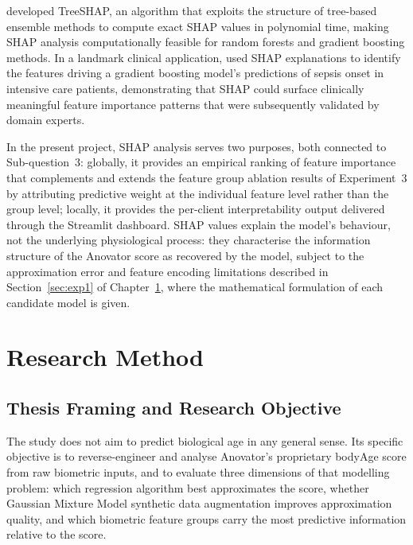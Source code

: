 \documentclass[11pt,a4paper]{report}
\begin{document}
\citet{Lundberg2020} developed TreeSHAP, an algorithm that exploits the structure of tree-based
ensemble methods to compute exact SHAP values in polynomial time, making SHAP analysis
computationally feasible for random forests and gradient boosting methods. In a landmark clinical
application, \citet{Lundberg2018} used SHAP explanations to identify the features driving a gradient
boosting model's predictions of sepsis onset in intensive care patients, demonstrating that SHAP
could surface clinically meaningful feature importance patterns that were subsequently validated by
domain experts.

In the present project, SHAP analysis serves two purposes, both connected to Sub-question~3: globally, it provides an empirical ranking of feature importance that complements and extends the feature group ablation results of Experiment~3 by attributing predictive weight at the individual feature level rather than the group level; locally, it provides the per-client interpretability output delivered through the Streamlit dashboard. SHAP values explain the model's behaviour, not the underlying physiological process: they characterise
the information structure of the Anovator score as recovered by the model, subject to the
approximation error and feature encoding limitations described in Section~\ref{sec:exp1} of Chapter~\ref{chap:method}, where the mathematical formulation of each candidate model is given.


\chapter{Research Method}
\label{chap:method}

\section{Thesis Framing and Research Objective}

The study does not aim to predict biological age in any general sense. Its specific objective is
to reverse-engineer and analyse Anovator's proprietary bodyAge score from raw biometric inputs, and
to evaluate three dimensions of that modelling problem: which regression algorithm best approximates
the score, whether Gaussian Mixture Model synthetic data augmentation improves approximation quality,
and which biometric feature groups carry the most predictive information relative to the score.
\end{document}
